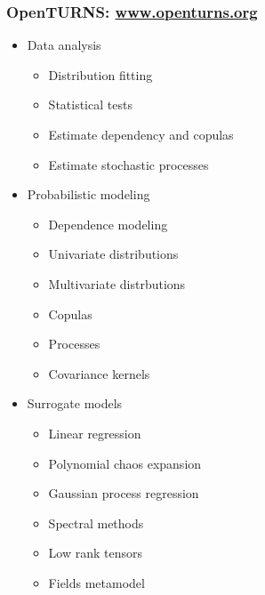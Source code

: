\documentclass{beamer}
\begin{document}
    \begin{frame}[containsverbatim]
        \frametitle{OpenTURNS: \url{www.openturns.org}}

      \begin{scriptsize}

      \begin{minipage}[t]{0.33\textwidth}
      \begin{itemize}
      \item Data analysis
      \begin{itemize}
      \tiny
      \item Distribution fitting
      \item Statistical tests
      \item Estimate dependency and copulas
      \item Estimate stochastic processes
      \end{itemize}
      \end{itemize}
      \end{minipage}%
      \begin{minipage}[t]{0.33\textwidth}
      \begin{itemize}
      \item Probabilistic modeling
      \begin{itemize}
      \tiny
      \item Dependence modeling
      \item Univariate distributions
      \item Multivariate distrbutions
      \item Copulas
      \item Processes
      \item Covariance kernels
      \end{itemize}
      \end{itemize}
      \end{minipage}%
      \begin{minipage}[t]{0.33\textwidth}
      \begin{itemize}
      \item Surrogate models
      \begin{itemize}
      \tiny
      \item Linear regression
      \item Polynomial chaos expansion
      \item Gaussian  process regression
      \item Spectral methods
      \item Low rank tensors
      \item Fields metamodel
      \end{itemize}
      \end{itemize}
      \end{minipage}


\end{scriptsize}
\end{frame}
\end{document}
